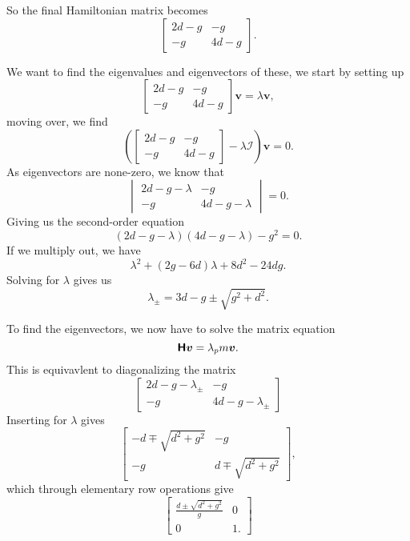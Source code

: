 \documentclass[a4paper, 11pt, notitlepage, english]{article}
\newcommand{\bt}[1]{\boldsymbol{#1}}
\newcommand{\mat}[1]{\textsf{\textbf{#1}}}
\newcommand{\I}{\boldsymbol{\mathcal{I}}}
\begin{document}
So the final Hamiltonian matrix becomes
$$\begin{bmatrix}
2d -g & -g \\
-g & 4d -g 
\end{bmatrix}.$$

We want to find the eigenvalues and eigenvectors of these, we start by setting up
$$\begin{bmatrix}
2d -g & -g \\
-g & 4d -g 
\end{bmatrix} \bt{v} = \lambda \bt{v},$$
moving over, we find
$$\left(\begin{bmatrix}
2d -g & -g \\
-g & 4d -g 
\end{bmatrix} - \lambda\I\right)\bt{v} = 0.$$
As eigenvectors are none-zero, we know that
$$\begin{vmatrix}
    2d - g - \lambda & - g \\ -g & 4d - g - \lambda 
\end{vmatrix}  = 0.$$
Giving us the second-order equation
$$(2d-g-\lambda)(4d-g-\lambda) - g^2 = 0.$$
If we multiply out, we have
$$\lambda^2 + (2g-6d)\lambda + 8d^2 - 24dg.$$
Solving for $\lambda$ gives us
$$\lambda_\pm = 3d -g \pm \sqrt{g^2 + d^2}.$$

To find the eigenvectors, we now have to solve the matrix equation
$$\mat{H}\bt{v} = \lambda_pm \bt{v}.$$
This is equivavlent to diagonalizing the matrix
$$
\begin{bmatrix}
2d - g - \lambda_\pm & -g \\
-g & 4d-g -\lambda_\pm
\end{bmatrix}
$$
Inserting for $\lambda$ gives
$$\begin{bmatrix}
-d \mp \sqrt{d^2 + g^2} & -g \\
-g & d \mp \sqrt{d^2 + g^2}
\end{bmatrix},$$
which through elementary row operations give
$$
\begin{bmatrix}
\frac{d\pm\sqrt{d^2 + g^2}}{g} & 0 \\
0 & 1.
\end{bmatrix}$$
\end{document}
